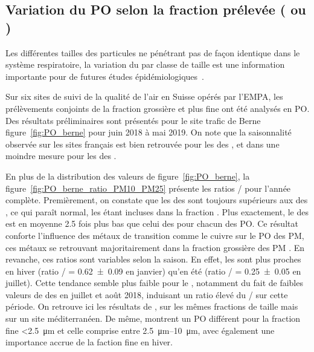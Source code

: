 \subsection{Variation du PO selon la fraction prélevée (\PMdix{} ou \PMdc)}%
\label{sub:pm10_pm2_5}

Les différentes tailles des particules ne pénétrant pas de façon identique dans le système
respiratoire, la variation du \POv{} par classe de taille est une information importante
pour de futures études épidémiologiques~\parencite{fangOxidative2019}.

Sur six sites de suivi de la qualité de l'air en Suisse opérés par l'EMPA, les prélèvements
conjoints de la fraction grossière \PMdix{} et plus fine \PMdc{} ont été analysés en PO.
Des résultats préliminaires sont présentés pour le site trafic de Berne
figure~\ref{fig:PO_berne} pour juin 2018 à mai 2019.  On note que la saisonnalité observée
sur les sites français est bien retrouvée pour les \POv{} des \PMdix, et dans une moindre
mesure pour les \POv{} des \PMdc.

En plus de la distribution des valeurs de \POv{} figure~\ref{fig:PO_berne}, la
figure~\ref{fig:PO_berne_ratio_PM10_PM25} présente les ratios \POv{} \PMdc/\PMdix{} pour
l'année complète. 
Premièrement, on constate que les \POv{} des \PMdix{} sont toujours supérieurs aux \POv{}
des \PMdc, ce qui paraît normal, les \PMdc{} étant incluses dans la fraction
\PMdix. Plus exactement, le \POv{} des \PMdc{} est en moyenne 2.5 fois plus bas que celui
des \PMdix{} pour chacun des PO. Ce résultat conforte l'influence des métaux de
transition comme le cuivre sur le PO des PM, ces métaux se retrouvant majoritairement
dans la fraction grossière des PM \parencite{harrisonPMF2011,pantCharacterization2017}.
En revanche, ces ratios sont variables selon la saison. En effet, les \POAAv{} sont
plus proches en hiver (ratio \PMdc/\PMdix{} = \num{0.62(9)} en janvier) qu'en été (ratio
\PMdc/\PMdix{} = \num{0.25(5)} en juillet). Cette tendance semble plus faible pour le
\PODTTv, notamment du fait de faibles valeurs de \PODTTv{} des \PMdix{} en juillet et août
2018, induisant un ratio élevé du \PODTTv{} \PMdc/\PMdix{} sur cette période.
On retrouve ici les résultats de \cite{perronePM22019}, sur les mêmes fractions de taille 
mais sur un site méditerranéen. De même, \cite{paraskevopoulouYearlong2019} montrent un PO 
différent pour la fraction fine \SI{<2.5}{\um} et celle comprise entre
\SIrange{2.5}{10}{\um}, avec également une importance accrue de la faction fine en hiver.

